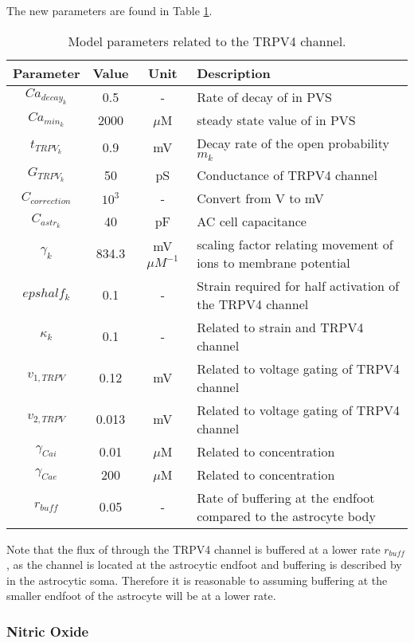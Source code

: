 	The new parameters are found in Table \ref{tab:NVU12trpv4param}. 
	
	\begin{table}[h!]
		\small
		\centering
			\begin{tabular}{c c c l}
		\hline
		Parameter & Value & Unit & Description \\
		\hline
		$Ca_{decay_k}$ & 0.5 & - & Rate of decay of \ca in PVS \\
		$Ca_{min_k}$ & 2000 & $\mu$M & steady state value of \ca in PVS \\
		$t_{TRPV_k}$ & 0.9 & mV & Decay rate of the open probability $m_k$ \\
		$G_{TRPV_k}$ & 50 & pS & Conductance of TRPV4 channel \\
		$C_{correction}$ & $10^3$ & - & Convert from V to mV \\
		$C_{astr_k}$ & 40 & pF & AC cell capacitance \\
		$\gamma_k$ & 834.3 & mV $\mu M^{-1}$ & scaling factor relating movement of ions to membrane potential \\
		$epshalf_k$ & 0.1 & - & Strain required for half activation of the TRPV4 channel \\
		$\kappa_k$ & 0.1 & - & Related to strain and TRPV4 channel \\
		$v_{1,TRPV}$ & 0.12 & mV & Related to voltage gating of TRPV4 channel \\
		$v_{2,TRPV}$ & 0.013 & mV & Related to voltage gating of TRPV4 channel \\
		$\gamma_{Cai}$ & 0.01 & $\mu$M & Related to \ca concentration \\
		$\gamma_{Cae}$ & 200 & $\mu$M & Related to \ca concentration \\
		$r_{buff}$ & 0.05 & - & Rate of \ca buffering at the endfoot compared to the astrocyte body \\
		\hline
			\end{tabular}
			\caption{Model parameters related to the TRPV4 channel.}
			\label{tab:NVU12trpv4param}
	\end{table}
	
	Note that the flux of \ca through the TRPV4 channel is buffered at a lower rate $r_{buff}$, as the channel is located at the astrocytic endfoot and buffering is described by \cite{Witthoft2013} in the astrocytic soma. Therefore it is reasonable to assuming buffering at the smaller endfoot of the astrocyte will be at a lower rate. 
	
	\subsubsection{Nitric Oxide}
	
